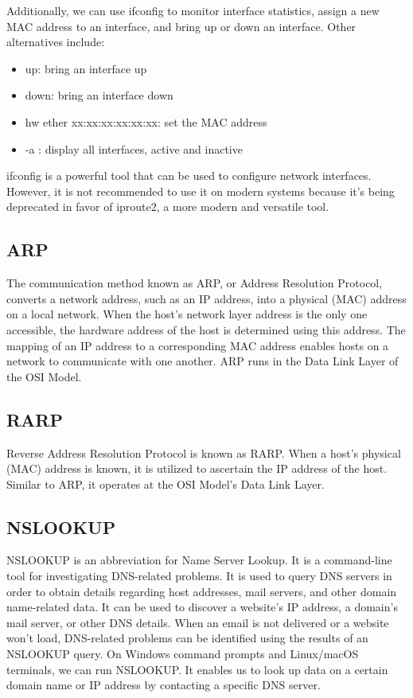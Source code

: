 \documentclass[11pt]{article}
\begin{document}
Additionally, we can use ifconfig to monitor interface statistics, assign a new MAC address to an interface, and bring up or down an interface. Other alternatives include:
\begin{itemize}
	\item up: bring an interface up
	\item down: bring an interface down
	\item hw ether xx:xx:xx:xx:xx:xx: set the MAC address
	\item -a : display all interfaces, active and inactive
\end{itemize}

ifconfig is a powerful tool that can be used to configure network interfaces. However, it is not recommended to use it on modern systems because it's being deprecated in favor of iproute2, a more modern and versatile tool.

\subsection{ARP}
The communication method known as ARP, or Address Resolution Protocol, converts a network address, such as an IP address, into a physical (MAC) address on a local network. When the host's network layer address is the only one accessible, the hardware address of the host is determined using this address. The mapping of an IP address to a corresponding MAC address enables hosts on a network to communicate with one another. ARP runs in the Data Link Layer of the OSI Model.
\subsection{RARP}
Reverse Address Resolution Protocol is known as RARP. When a host's physical (MAC) address is known, it is utilized to ascertain the IP address of the host. Similar to ARP, it operates at the OSI Model's Data Link Layer.
\subsection{NSLOOKUP}
NSLOOKUP is an abbreviation for Name Server Lookup. It is a command-line tool for investigating DNS-related problems. It is used to query DNS servers in order to obtain details regarding host addresses, mail servers, and other domain name-related data. It can be used to discover a website's IP address, a domain's mail server, or other DNS details. When an email is not delivered or a website won't load, DNS-related problems can be identified using the results of an NSLOOKUP query. On Windows command prompts and Linux/macOS terminals, we can run NSLOOKUP. It enables us to look up data on a certain domain name or IP address by contacting a specific DNS server.
\end{document}
